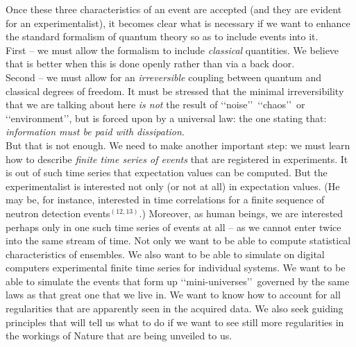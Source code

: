 \documentclass[12pt]{article}
\def\lqq{\lq\lq}
\def\rqq{\rq\rq}
\begin{document}
Once these three characteristics of an event are accepted (and they are
evident for an experimentalist), it becomes clear what is necessary if
we want to enhance the standard formalism of quantum theory so as to
include events into it.\\

First -- we must allow the formalism to include {\sl classical} quantities.
We believe that
is better when this is done openly rather than via a back door.\\
Second -- we must allow for an {\sl irreversible} coupling between quantum
and classical degrees of freedom. It must be stressed that the minimal
irreversibility that we are talking about here {\sl is not} the result of
\lqq noise\rqq\, \lqq chaos\rqq\, or \lqq environment\rqq, but is forced
upon by a universal law: the one stating that: {\sl information must be
paid with dissipation}.\\ But that is not enough. We need to make
another important step: we must learn how to describe {\sl finite time series
of events} that are registered in experiments. It is out of such time
series that expectation values can be computed. But the experimentalist
is interested not only (or not at all) in expectation values. (He may be,
for instance, interested in time correlations for a finite sequence of
neutron detection events$^{(12,13)}$.) Moreover, as human beings, we are
interested perhaps only in one such time series of events at all -- as we
cannot enter twice into the same stream of time. Not only we want to be
able to compute statistical characteristics of ensembles. We also want
to be able to simulate on digital computers experimental finite time
series for individual systems. We want to be able to simulate the events
that form up \lqq mini-universes\rqq\, governed by the same laws as that
great one that we live in. We want to know how to account for all
regularities that are apparently seen in the acquired data. We also seek
guiding principles that will tell us what to do if we want to see still
more regularities in the workings of Nature that are being unveiled to
us.
\end{document}
